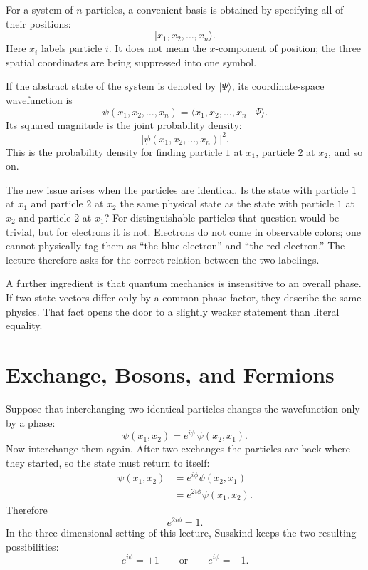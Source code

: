 For a system of \(n\) particles, a convenient basis is obtained by specifying all of their positions:
\begin{equation}
|x_1,x_2,\ldots,x_n\rangle.
\end{equation}
Here \(x_i\) labels particle \(i\). It does not mean the \(x\)-component of position; the three spatial coordinates are being suppressed into one symbol.

If the abstract state of the system is denoted by \(|\Psi\rangle\), its coordinate-space wavefunction is
\begin{equation}
\psi(x_1,x_2,\ldots,x_n)=\langle x_1,x_2,\ldots,x_n\mid \Psi\rangle.
\end{equation}
Its squared magnitude is the joint probability density:
\begin{equation}
|\psi(x_1,x_2,\ldots,x_n)|^2.
\end{equation}
This is the probability density for finding particle \(1\) at \(x_1\), particle \(2\) at \(x_2\), and so on.

The new issue arises when the particles are identical. Is the state with particle \(1\) at \(x_1\) and particle \(2\) at \(x_2\) the same physical state as the state with particle \(1\) at \(x_2\) and particle \(2\) at \(x_1\)? For distinguishable particles that question would be trivial, but for electrons it is not. Electrons do not come in observable colors; one cannot physically tag them as ``the blue electron'' and ``the red electron.'' The lecture therefore asks for the correct relation between the two labelings.

A further ingredient is that quantum mechanics is insensitive to an overall phase. If two state vectors differ only by a common phase factor, they describe the same physics. That fact opens the door to a slightly weaker statement than literal equality.

\section{Exchange, Bosons, and Fermions}

Suppose that interchanging two identical particles changes the wavefunction only by a phase:
\begin{equation}
\psi(x_1,x_2)=e^{i\phi}\,\psi(x_2,x_1).
\end{equation}
Now interchange them again. After two exchanges the particles are back where they started, so the state must return to itself:
\begin{align}
\psi(x_1,x_2)
&=e^{i\phi}\psi(x_2,x_1) \\
&=e^{2i\phi}\psi(x_1,x_2).
\end{align}
Therefore
\begin{equation}
e^{2i\phi}=1.
\end{equation}
In the three-dimensional setting of this lecture, Susskind keeps the two resulting possibilities:
\begin{equation}
e^{i\phi}=+1
\qquad \text{or} \qquad
e^{i\phi}=-1.
\end{equation}

